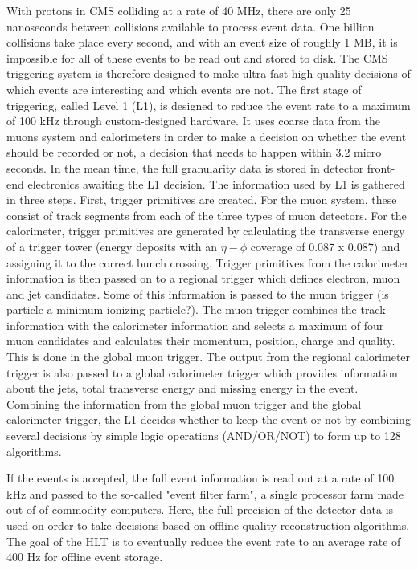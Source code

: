 With protons in CMS colliding at a rate of 40 MHz, there are only 25 nanoseconds between collisions available to process event data. One billion collisions take place every second, and with an event size of roughly 1 MB, it is impossible for all of these events to be read out and stored to disk.
The CMS triggering system is therefore designed to make ultra fast high-quality decisions of which events are interesting and which events are not.
The first stage of triggering, called Level 1 (L1), is designed to reduce the event rate to a maximum of 100 kHz through custom-designed hardware. It uses coarse data from the muons system and calorimeters in order to make a decision on whether the event should be recorded or not, a decision that needs to happen within 3.2 micro seconds. In the mean time, the full granularity data is stored in detector front-end electronics awaiting the L1 decision.
The information used by L1 is gathered in three steps. First, trigger primitives are created. For the muon system, these consist of
track segments from each of the three types of muon detectors. For the calorimeter, trigger primitives are generated by
calculating the transverse energy of a trigger tower (energy deposits with an $\eta-\phi$ coverage of 0.087 x 0.087) and assigning it to the correct bunch crossing.
Trigger primitives from the calorimeter information is then passed on to a regional trigger which defines electron, muon and jet candidates. Some of this information is passed to the muon trigger (is particle a minimum ionizing particle?).
The muon trigger combines the track information with the calorimeter information and selects a maximum of four muon candidates and calculates their momentum, position, charge and quality. This is done in the global muon trigger.
The output from the regional calorimeter trigger is also passed to a global calorimeter trigger which provides information about the jets, total transverse energy and missing energy in the event.
Combining the information from the global muon trigger and the global calorimeter trigger, the L1 decides whether to keep the event or not by combining several decisions by simple logic operations (AND/OR/NOT) to form up to 128 algorithms.

If the events is accepted, the full event information is read out at a rate of 100 kHz and passed to the so-called "event filter farm", a single processor farm made out of of commodity computers. Here, the full precision of the detector data is used on order to take decisions based on offline-quality reconstruction algorithms. The goal of the HLT is to eventually reduce the event rate to an average rate of 400 Hz for offline event storage.
